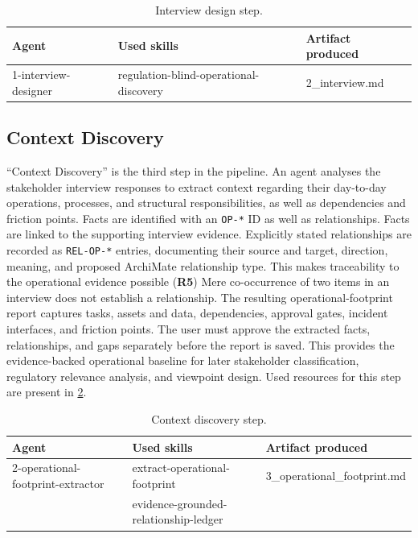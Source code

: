 \begin{table}[ht]
\centering
\begin{tabular}{lll}
\hline
\textbf{Agent} & \textbf{Used skills} & \textbf{Artifact produced} \\
\hline
1-interview-designer & regulation-blind-operational-discovery & 2\_interview.md \\
\hline
\end{tabular}
\caption{Interview design step.}
\label{tab:interview-design}
\end{table}

\subsection{Context Discovery}
\label{ContextDisc}

``Context Discovery'' is the third step in the pipeline. An agent analyses the stakeholder interview responses to extract context regarding their day-to-day operations, processes, and structural responsibilities, as well as dependencies and friction points. Facts are identified with an \texttt{OP-*} \ac{ID} as well as relationships. Facts are linked to the supporting interview evidence. Explicitly stated relationships are recorded as \texttt{REL-OP-*} entries, documenting their source and target, direction, meaning, and proposed ArchiMate relationship type. This makes traceability to the operational evidence possible (\textbf{R5}) Mere co-occurrence of two items in an interview does not establish a relationship.
The resulting operational-footprint report captures tasks, assets and data, dependencies, approval gates, incident interfaces, and friction points. The user must approve the extracted facts, relationships, and gaps separately before the report is saved. This provides the evidence-backed operational baseline for later stakeholder classification, regulatory relevance analysis, and viewpoint design. Used resources for this step are present in \ref{tab:context-discovery}.

\begin{table}[ht]
\centering
\begin{tabular}{lll}
\hline
\textbf{Agent} & \textbf{Used skills} & \textbf{Artifact produced} \\
\hline
2-operational-footprint-extractor &
extract-operational-footprint &
3\_operational\_footprint.md \\
 &
evidence-grounded-relationship-ledger &
\\
\hline
\end{tabular}
\caption{Context discovery step.}
\label{tab:context-discovery}
\end{table}

